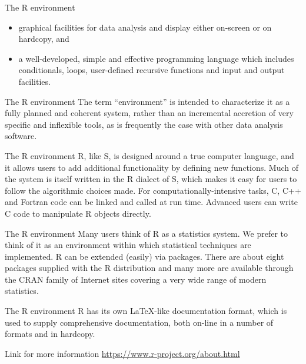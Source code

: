 \documentclass[
  ignorenonframetext,
]{beamer}
\providecommand{\tightlist}{%
  \setlength{\itemsep}{0pt}\setlength{\parskip}{0pt}}
\begin{document}
\begin{frame}{The R environment}
\protect\hypertarget{the-r-environment-1}{}
\begin{itemize}[<+->]
\tightlist
\item
  graphical facilities for data analysis and display either on-screen or
  on hardcopy, and
\item
  a well-developed, simple and effective programming language which
  includes conditionals, loops, user-defined recursive functions and
  input and output facilities.
\end{itemize}
\end{frame}

\begin{frame}{The R environment}
\protect\hypertarget{the-r-environment-2}{}
The term ``environment'' is intended to characterize it as a fully
planned and coherent system, rather than an incremental accretion of
very specific and inflexible tools, as is frequently the case with other
data analysis software.
\end{frame}

\begin{frame}{The R environment}
\protect\hypertarget{the-r-environment-3}{}
R, like S, is designed around a true computer language, and it allows
users to add additional functionality by defining new functions. Much of
the system is itself written in the R dialect of S, which makes it easy
for users to follow the algorithmic choices made. For
computationally-intensive tasks, C, C++ and Fortran code can be linked
and called at run time. Advanced users can write C code to manipulate R
objects directly.
\end{frame}

\begin{frame}{The R environment}
\protect\hypertarget{the-r-environment-4}{}
Many users think of R as a statistics system. We prefer to think of it
as an environment within which statistical techniques are implemented. R
can be extended (easily) via packages. There are about eight packages
supplied with the R distribution and many more are available through the
CRAN family of Internet sites covering a very wide range of modern
statistics.
\end{frame}

\begin{frame}{The R environment}
\protect\hypertarget{the-r-environment-5}{}
R has its own LaTeX-like documentation format, which is used to supply
comprehensive documentation, both on-line in a number of formats and in
hardcopy.

Link for more information \url{https://www.r-project.org/about.html}
\end{frame}
\end{document}
